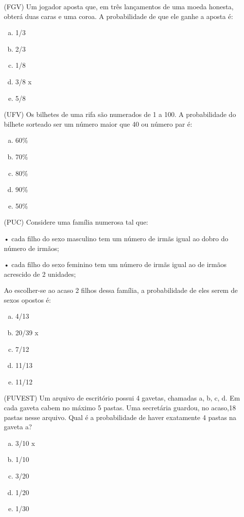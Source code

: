 \item (FGV) Um jogador aposta que, em três lançamentos de uma moeda honesta, obterá duas caras e uma coroa. A probabilidade de que ele ganhe a aposta é:
\begin{multicols}{5}
\begin{enumerate}[a)]
	\item 1/3
	\item 2/3
	\item 1/8
	\item 3/8  x
	\item 5/8
\end{enumerate}
\end{multicols}

\item (UFV) Os bilhetes de uma rifa são numerados de 1 a 100. A probabilidade do bilhete sorteado ser um número maior que 40 ou número par é:
\begin{multicols}{5}
\begin{enumerate}[a)]
	\item 60\%
	\item 70\% 
	\item 80\%
	\item 90\%
	\item 50\%
\end{enumerate}
\end{multicols}

\item (PUC) Considere uma família numerosa tal que:

• cada filho do sexo masculino tem um número de irmãs igual ao dobro do número de irmãos;

• cada filho do sexo feminino tem um número de irmãs igual ao de irmãos acrescido de 2 unidades;

Ao escolher-se ao acaso 2 filhos dessa família, a probabilidade de eles serem de sexos opostos é:
\begin{multicols}{5}
\begin{enumerate}[a)]
	\item 4/13
	\item 20/39  x
	\item 7/12
	\item 11/13
	\item 11/12 
\end{enumerate}
\end{multicols}

\item (FUVEST) Um arquivo de escritório possui 4 gavetas, chamadas a, b, c, d. Em cada gaveta cabem no máximo 5 pastas. Uma secretária guardou, no acaso,18 pastas nesse arquivo. Qual é a probabilidade de haver exatamente 4 pastas na gaveta a?
\begin{multicols}{5}
\begin{enumerate}[a)]
	\item 3/10  x
	\item 1/10
	\item 3/20
	\item 1/20 
	\item 1/30
\end{enumerate}
\end{multicols}

